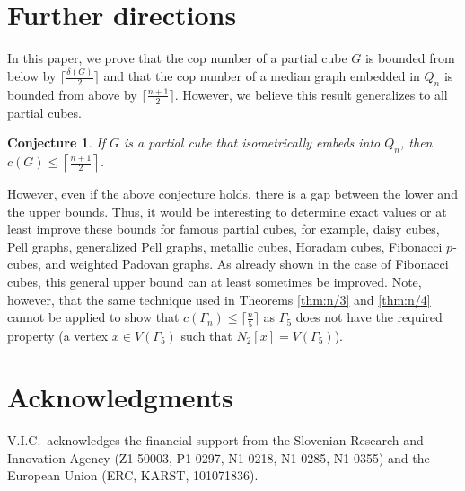 \documentclass[11pt]{article}
\newtheorem{conjecture}[theorem]{Conjecture}
\begin{document}
\section{Further directions}

In this paper, we prove that the cop number of a partial cube $G$ is bounded from below by $\lceil \frac{\delta(G)}{2} \rceil$ and that the cop number of a median graph embedded in $Q_n$ is bounded from above by $\lceil \frac{n+1}{2} \rceil$. However, we believe this result generalizes to all partial cubes.

\begin{conjecture}
    If $G$ is a partial cube that isometrically embeds into $Q_n$, then $c(G) \leq \left \lceil \frac{n+1}{2} \right \rceil$.
\end{conjecture}

However, even if the above conjecture holds, there is a gap between the lower and the upper bounds. Thus, it would be interesting to determine exact values or at least improve these bounds for famous partial cubes, for example, daisy cubes, Pell graphs, generalized Pell graphs, metallic cubes, Horadam cubes, Fibonacci $p$-cubes, and weighted Padovan graphs. As already shown in the case of Fibonacci cubes, this general upper bound can at least sometimes be improved. Note, however, that the same technique used in Theorems \ref{thm:n/3} and \ref{thm:n/4} cannot be applied to show that $c(\Gamma_n) \leq \lceil \frac{n}{5} \rceil$ as $\Gamma_5$ does not have the required property (a vertex $x \in V(\Gamma_5)$ such that $N_2[x] = V(\Gamma_5)$).

\section*{Acknowledgments}

V.I.C.\ acknowledges the financial support from the Slovenian Research and Innovation Agency (Z1-50003, P1-0297, N1-0218, N1-0285, N1-0355) and the European Union (ERC, KARST, 101071836).
\end{document}
